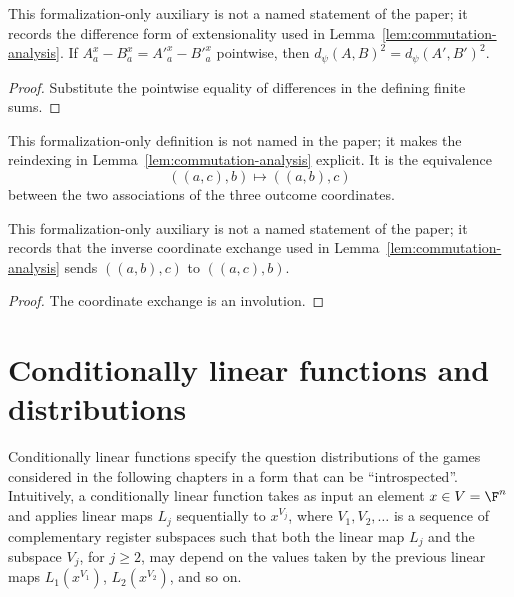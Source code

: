 \begin{lemma}
	\label{lem:distance-congr-sub}
	\leanok
	This formalization-only auxiliary is not a named statement of the paper; it
	records the difference form of extensionality used in
	Lemma~\ref{lem:commutation-analysis}. If $A^x_a-B^x_a=A'^x_a-B'^x_a$
	pointwise, then $d_\psi(A,B)^2=d_\psi(A',B')^2$.
\end{lemma}
\begin{proof}
	\leanok
	Substitute the pointwise equality of differences in the defining finite
	sums.
\end{proof}

\begin{definition}
	\label{def:distance-swap-last}
	\leanok
	This formalization-only definition is not named in the paper; it makes the
	reindexing in Lemma~\ref{lem:commutation-analysis} explicit. It is the
	equivalence
	\[
		((a,c),b)\longmapsto((a,b),c)
	\]
	between the two associations of the three outcome coordinates.
\end{definition}

\begin{lemma}
	\label{lem:distance-swap-last-inverse}
	\leanok
	This formalization-only auxiliary is not a named statement of the paper; it
	records that the inverse coordinate exchange used in
	Lemma~\ref{lem:commutation-analysis} sends $((a,b),c)$ to $((a,c),b)$.
\end{lemma}
\begin{proof}
	\leanok
	The coordinate exchange is an involution.
\end{proof}

\section{Conditionally linear functions and distributions}
\label{sec:cl}

Conditionally linear functions specify the question distributions of the games considered in the following chapters in a form that can be ``introspected''. Intuitively, a conditionally linear function takes as input an element $x \in V = \F^n$ and applies linear maps $L_j$ sequentially to $x^{V_j}$, where $V_1, V_2, \dots$ is a sequence of complementary register subspaces such that both the linear map $L_j$ and the subspace $V_j$, for $j \ge 2$, may depend on the values taken by the previous linear maps $L_1(x^{V_1})$, $L_2(x^{V_2})$, and so on.

